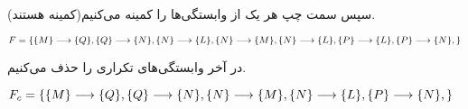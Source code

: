 \documentclass{article}
\begin{document}
سپس سمت چپ هر یک از وابستگی‌ها را کمینه می‌کنیم(کمینه هستند).
\begin{latin}
$
\\F=\\
\{\\
	\{M\}\longrightarrow\{Q\},\\
	\{Q\}\longrightarrow\{N\},\\
	\{N\}\longrightarrow\{L\},\\
	\{N\}\longrightarrow\{M\},\\
	\{N\}\longrightarrow\{L\},\\
	\{P\}\longrightarrow\{L\},\\
	\{P\}\longrightarrow\{N\},\\
\}
$
\end{latin}

در آخر وابستگی‌های تکراری را حذف می‌کنیم.
\begin{latin}
$
\\F_{c}=\\
\{\\
	\{M\}\longrightarrow\{Q\},\\
	\{Q\}\longrightarrow\{N\},\\
	\{N\}\longrightarrow\{M\},\\
	\{N\}\longrightarrow\{L\},\\
	\{P\}\longrightarrow\{N\},\\
\}
$
\end{latin}
\end{document}
